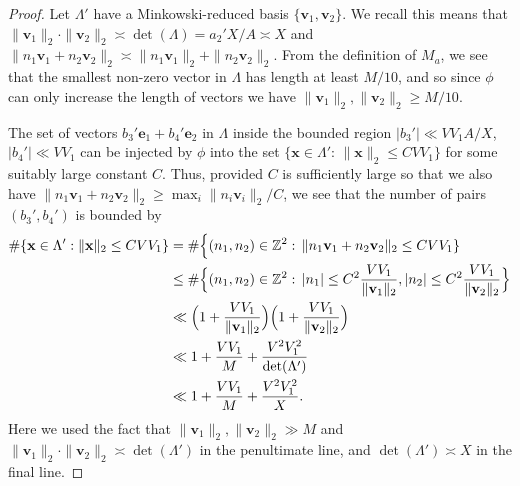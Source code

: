 \documentclass[10pt]{amsart}
\theoremstyle{plain}
\numberwithin{sblmm}{thrm}
\numberwithin{equation}{section}
\begin{document}
\begin{proof}
Let $\Lambda'$ have a Minkowski-reduced basis $\{\mathbf{v}_1,\mathbf{v}_2\}$. We recall this means that $\|\mathbf{v}_1\|_2\cdot \|\mathbf{v}_2\|_2\asymp \det(\Lambda)=a_2'X/A\asymp X$ and $\|n_1\mathbf{v}_1+n_2\mathbf{v}_2\|_2\asymp \|n_1\mathbf{v}_1\|_2+\|n_2\mathbf{v}_2\|_2$. From the definition of $M_a$, we see that the smallest non-zero vector in $\Lambda$ has length at least $M/10$, and so since $\phi$ can only increase the length of vectors we have $\|\mathbf{v}_1\|_2,\|\mathbf{v}_2\|_2\ge M/10$. 

The set of vectors $b_3'\mathbf{e}_1+b_4'\mathbf{e}_2$ in $\Lambda$ inside the bounded region $|b_3'|\ll  V V_1 A/X$, $|b_4'|\ll V V_1$ can be injected by $\phi$ into the set $\{\mathbf{x}\in\Lambda':\,\|\mathbf{x}\|_2\le CV V_1\}$ for some suitably large constant $C$. Thus, provided $C$ is sufficiently large so that we also have $\|n_1\mathbf{v}_1+n_2\mathbf{v}_2\|_2\ge \max_i\|n_i\mathbf{v}_i\|_2/C$, we see that the number of pairs $(b_3',b_4')$ is bounded by
\begin{align*}
\#\{\mathbf{x}\in\Lambda':\|\mathbf{x}\|_2\le C V V_1\}&=\#\Bigl\{(n_1,n_2)\in\mathbb{Z}^2:\,\|n_1\mathbf{v}_1+n_2\mathbf{v}_2\|_2\le C V V_1\}\\
&\le \#\Bigl\{(n_1,n_2)\in\mathbb{Z}^2:\,|n_1|\le C^2\frac{V V_1}{\|\mathbf{v}_1\|_2},|n_2|\le C^2\frac{V V_1}{\|\mathbf{v}_2\|_2}\Bigr\}\\
&\ll \Bigl(1+\frac{V V_1}{\|\mathbf{v}_1\|_2}\Bigr)\Bigl(1+\frac{V V_1}{\|\mathbf{v}_2\|_2}\Bigr)\\
&\ll 1+ \frac{V V_1}{M}+\frac{V^2V_1^2}{\det(\Lambda')}\\
&\ll 1+\frac{V V_1}{M}+\frac{V^2 V_1^2}{X}.
\end{align*}
Here we used the fact that $\|\mathbf{v}_1\|_2,\|\mathbf{v}_2\|_2\gg M$ and $\|\mathbf{v}_1\|_2\cdot\|\mathbf{v}_2\|_2\asymp \det(\Lambda')$ in the penultimate line, and $\det(\Lambda')\asymp X$ in the final line.


\end{proof}
\end{document}
